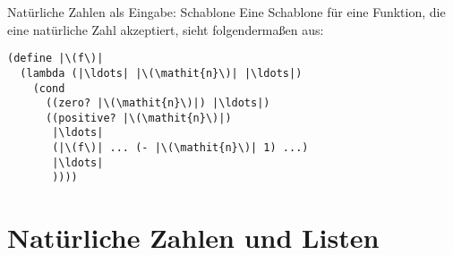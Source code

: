 \begin{konstruktionsanleitung}{Natürliche Zahlen als Eingabe: Schablone}
  \label{ka:nats-eingabe-schablone}
  Eine Schablone für eine Funktion, die eine natürliche Zahl akzeptiert, sieht
folgendermaßen aus:
%
\begin{lstlisting}
(define |\(f\)|
  (lambda (|\ldots| |\(\mathit{n}\)| |\ldots|)
    (cond
      ((zero? |\(\mathit{n}\)|) |\ldots|)
      ((positive? |\(\mathit{n}\)|)
       |\ldots|
       (|\(f\)| ... (- |\(\mathit{n}\)| 1) ...)
       |\ldots|
       ))))
\end{lstlisting}
  
\end{konstruktionsanleitung}

\section{Natürliche Zahlen und Listen}
\label{func:copies}

